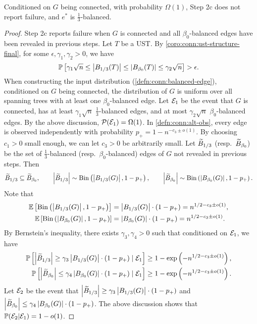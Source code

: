 \begin{lemma} \label{lem:conn:phase-2:step-c:failure}
  Conditioned on $G$ being connected, with probability $\Omega(1)$, Step 2c does not report failure, and $e^*$ is $\frac 13$-balanced.
\end{lemma}
\begin{proof}
  Step 2c reports failure when $G$ is connected and all $\beta_0$-balanced edges have been revealed in previous steps.
  Let $T$ be a UST.
  By \cref{coro:conn:ust-structure-final}, for some $\epsilon,\gamma_1,\gamma_2>0$, we have
  \begin{align*}
    \mathbb{P}\left[\gamma_1 \sqrt n \le \left| B_{1/3}(T) \right| \le \left| B_{\beta_0}(T) \right| \le \gamma_2 \sqrt n\right] > \epsilon.
  \end{align*}
  When constructing the input distribution (\cref{defn:conn:balanced-edge}), conditioned on $G$ being connected, the distribution of $G$ is uniform over all spanning trees with at least one $\beta_0$-balanced edge.
  Let $\mathcal{E}_1$ be the event that $G$ is connected, has at least $\gamma_1 \sqrt n$ $\frac 13$-balanced edges, and at most $\gamma_2 \sqrt n$ $\beta_0$-balanced edges.
  By the above discussion, $\mathcal{P}(\mathcal{E}_1) = \Omega(1)$.
  In \cref{defn:conn:alt-obs}, every edge is observed independently with probability $p_+ = 1-n^{-c_3\pm o(1)}$.
  By choosing $c_1>0$ small enough, we can let $c_3>0$ be arbitrarily small.
  Let $\widetilde B_{1/3}$ (resp.~$\widetilde B_{\beta_0}$) be the set of $\frac 13$-balanced (resp.~$\beta_0$-balanced) edges of $G$ not revealed in previous steps.
  Then
  \begin{align*}
    \widetilde B_{1/3} \subseteq \widetilde B_{\beta_0}, \qquad
    \left|\widetilde B_{1/3}\right| \sim \operatorname{\mathrm{Bin}}\left(\left| B_{1/3}(G) \right|, 1-p_+\right), \qquad
    \left|\widetilde B_{\beta_0}\right| \sim \operatorname{\mathrm{Bin}}\left(\left| B_{\beta_0}(G) \right|, 1-p_+\right).
  \end{align*}
  Note that
  \begin{align*}
    \mathbb{E}\left[\operatorname{\mathrm{Bin}}\left(\left| B_{1/3}(G) \right|, 1-p_+\right)\right] &= \left| B_{1/3}(G) \right| \cdot (1-p_+) = n^{1/2-c_3 \pm o(1)}, \\
    \mathbb{E}\left[\operatorname{\mathrm{Bin}}\left(\left| B_{\beta_0}(G) \right|, 1-p_+\right)\right] &= \left| B_{\beta_0}(G) \right| \cdot (1-p_+) = n^{1/2-c_3 \pm o(1)}.
  \end{align*}
  By Bernstein's inequality, there exists $\gamma_3,\gamma_4>0$ such that conditioned on $\mathcal{E}_1$, we have
  \begin{align*}
    \mathbb{P}\left[ \left|\widetilde B_{1/3}\right| \ge \gamma_3 \left| B_{1/3}(G) \right| \cdot (1-p_+) \mid \mathcal{E}_1\right] \ge 1-\exp\left(-n^{1/2-c_3 \pm o(1)}\right),\\
    \mathbb{P}\left[ \left|\widetilde B_{\beta_0}\right| \le \gamma_4 \left| B_{\beta_0}(G) \right| \cdot (1-p_+) \mid \mathcal{E}_1\right] \ge 1-\exp\left(-n^{1/2-c_3 \pm o(1)}\right).
  \end{align*}
  Let $\mathcal{E}_2$ be the event that $\left|\widetilde B_{1/3}\right| \ge \gamma_3 \left| B_{1/3}(G) \right| \cdot (1-p_+)$ and $\left|\widetilde B_{\beta_0}\right| \le \gamma_4 \left| B_{\beta_0}(G) \right| \cdot (1-p_+)$.
  The above discussion shows that $\mathbb{P}(\mathcal{E}_2 | \mathcal{E}_1) = 1-o(1)$.


\end{proof}

